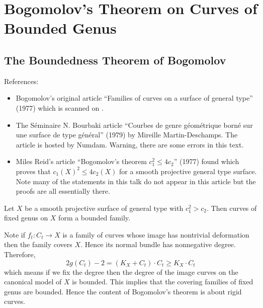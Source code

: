\documentclass[main.tex]{subfiles}
\begin{document}
\chapter{Bogomolov's Theorem on Curves of Bounded Genus}


\section{The Boundedness Theorem of Bogomolov}

References:

\begin{itemize}
\item [1] Bogomolov's original article ``Families of curves on a surface of general type'' (1977) which is scanned on .
\item [2] The S\'{e}minaire N. Bourbaki article ``Courbes de genre g\'{e}om\'{e}trique born\'{e} sur une surface de type g\'{e}n\'{e}ral'' (1979) by Mireille Martin-Deschamps. The article is hosted  by Numdam. Warning, there are some errors in this text.
\item [3] Miles Reid's article ``Bogomolov's theorem $c_1^2 \le 4 c_2$'' (1977) found  which proves that $c_1(X)^2 \le 4 c_2(X)$ for a smooth projective general type surface. Note many of the statements in this talk do not appear in this article but the proofs are all essentially there.
\end{itemize}

\begin{theorem}[Bogomolov]
Let $X$ be a smooth projective surface of general type with $c_1^2 > c_2$. Then curves of fixed genus on $X$ form a bounded family.
\end{theorem}

\begin{rmk}
Note if $f_t : C_t \to X$ is a family of curves whose image has nontrivial deformation then the family covers $X$. Hence its normal bundle has nonnegative degree. Therefore,
\[ 2g(C_t) - 2 = (K_X + C_t) \cdot C_t \ge K_X \cdot C_t \]
which means if we fix the degree then the degree of the image curves on the canonical model of $X$ is bounded. This implies that the covering families of fixed genus are bounded. Hence the content of Bogomolov's theorem is about rigid curves.
\end{rmk}
\end{document}
